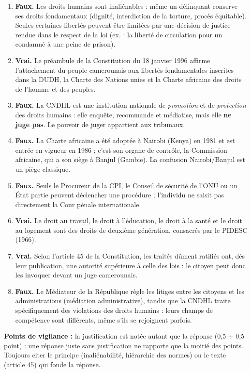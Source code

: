 \documentclass[11pt]{article}
\newcommand{\cle}[1]{{\popxbold\color{popdark}#1}}
\begin{document}
\begin{corrige}
\begin{enumerate}
\item \textbf{Faux.} Les droits humains sont \cle{inaliénables} : même un délinquant conserve ses droits fondamentaux (dignité, interdiction de la torture, procès équitable). Seules certaines libertés peuvent être limitées par une décision de justice rendue dans le respect de la loi (ex. : la liberté de circulation pour un condamné à une peine de prison).
\item \textbf{Vrai.} Le préambule de la Constitution du 18 janvier 1996 affirme l'attachement du peuple camerounais aux libertés fondamentales inscrites dans la DUDH, la Charte des Nations unies et la Charte africaine des droits de l'homme et des peuples.
\item \textbf{Faux.} La CNDHL est une institution nationale de \emph{promotion} et de \emph{protection} des droits humains : elle enquête, recommande et médiatise, mais elle \textbf{ne juge pas}. Le pouvoir de juger appartient aux tribunaux.
\item \textbf{Faux.} La Charte africaine a été adoptée à \cle{Nairobi} (Kenya) en 1981 et est entrée en vigueur en 1986 ; c'est son organe de contrôle, la Commission africaine, qui a son siège à Banjul (Gambie). La confusion Nairobi/Banjul est un piège classique.
\item \textbf{Faux.} Seuls le Procureur de la CPI, le Conseil de sécurité de l'ONU ou un État partie peuvent déclencher une procédure ; l'individu ne saisit pas directement la Cour pénale internationale.
\item \textbf{Vrai.} Le droit au travail, le droit à l'éducation, le droit à la santé et le droit au logement sont des droits de deuxième génération, consacrés par le PIDESC (1966).
\item \textbf{Vrai.} Selon l'article 45 de la Constitution, les traités dûment ratifiés ont, dès leur publication, une autorité supérieure à celle des lois : le citoyen peut donc les invoquer devant un juge camerounais.
\item \textbf{Faux.} Le Médiateur de la République règle les litiges entre les citoyens et les administrations (médiation administrative), tandis que la CNDHL traite spécifiquement des violations des droits humains : leurs champs de compétence sont différents, même s'ils se rejoignent parfois.
\end{enumerate}

\textbf{Points de vigilance :} la justification est notée autant que la réponse (0,5 + 0,5 point) : une réponse juste sans justification ne rapporte que la moitié des points. Toujours citer le principe (inaliénabilité, hiérarchie des normes) ou le texte (article 45) qui fonde la réponse.
\end{corrige}
\end{document}

